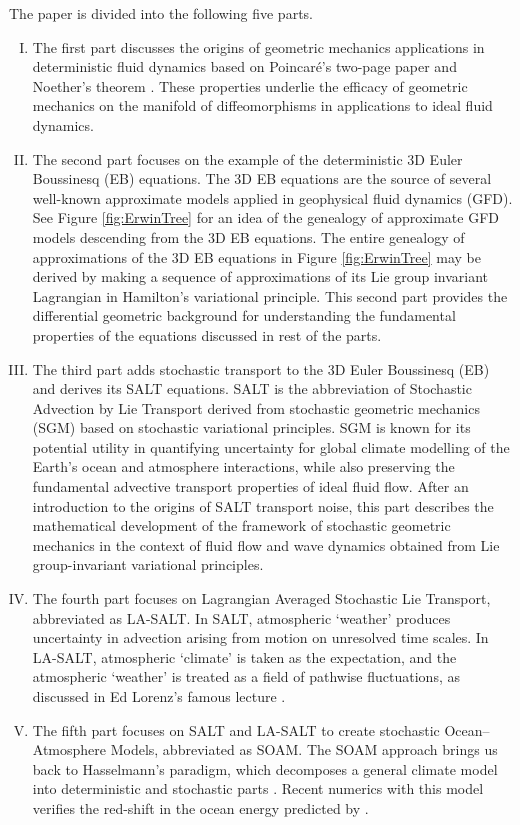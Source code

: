 \documentclass[11pt, oneside]{article}   	%
\numberwithin{equation}{section}
\theoremstyle{plain}
\theoremstyle{definition}
\theoremstyle{remark}
\newcommand{\<}{\langle}
\renewcommand{\>}{\rangle}
\begin{document}
The paper is divided into the following five parts. 
\begin{enumerate}[(I)]
\item
The first part discusses the origins of geometric mechanics applications in deterministic fluid dynamics based on Poincar\'e's two-page paper \cite{poincare1901forme} and Noether's theorem \cite{noether1918invariante}. These properties underlie the efficacy of geometric mechanics on the manifold of diffeomorphisms in applications to ideal fluid dynamics.

\item
The second part focuses on the example of the deterministic 3D Euler Boussinesq (EB) equations. The 3D EB equations are 
the source of several well-known approximate models applied in geophysical fluid dynamics (GFD). 
See Figure \ref{fig:ErwinTree} for an idea 
of the genealogy of approximate GFD models descending from the 3D EB equations. 
The entire genealogy of approximations of the 3D EB equations in Figure \ref{fig:ErwinTree} may be derived by making a sequence of approximations 
of its Lie group invariant Lagrangian in Hamilton's variational principle. This second part provides the differential geometric background for understanding the fundamental properties of the equations discussed in rest of the parts.

\item
The third part adds stochastic transport to the 3D Euler Boussinesq (EB) and derives its SALT equations. 
SALT is the abbreviation of Stochastic Advection by Lie Transport derived from  
stochastic geometric mechanics (SGM) based on stochastic variational principles. SGM is known for its potential utility in quantifying uncertainty for global climate modelling of the Earth's ocean and atmosphere interactions, while also preserving the fundamental advective transport properties of ideal fluid flow. After an introduction to the origins of SALT transport noise, this part describes the mathematical development of the framework of stochastic geometric mechanics in the context of fluid flow and wave dynamics obtained from Lie group-invariant variational principles.

\item
The fourth part focuses on Lagrangian Averaged Stochastic Lie Transport, abbreviated as LA-SALT.
In SALT, atmospheric `weather' produces uncertainty in advection arising
from motion on unresolved time scales. In LA-SALT, atmospheric `climate' is taken as the
expectation, and the atmospheric `weather' is treated as a field of pathwise fluctuations, 
as discussed in Ed Lorenz's famous lecture \cite{Lorenz1995}. 

\item
The fifth part focuses on SALT and LA-SALT to create stochastic Ocean--Atmosphere Models, abbreviated as SOAM. 
The SOAM approach brings us back to Hasselmann's paradigm, which decomposes a general climate model into deterministic 
and stochastic parts \cite{hasselmann1976stochastic}. Recent numerics with this model \cite{sharma2026structure} verifies 
the red-shift in the ocean energy predicted by  \cite{hasselmann1976stochastic}.
\end{enumerate}
\end{document}
